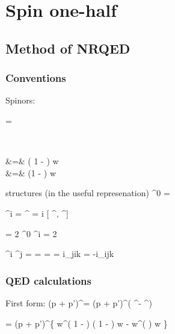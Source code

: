 \chapter{Spin one-half}

\section{Method of NRQED}
\subsection{Conventions}
Spinors:

\beq
	\sr = \begin{pmatrix} \eta \\ \chi \end{pmatrix}
\eeq

\beqa
	\eta &=& \left( 1  -  \right ) w	\\
	\chi &=& 	 \left(1 -  \right ) w	\\
\eeqa

structures (in the useful represenation)
\beq
	\gamma^0 = 
\eeq

\beq
	\gamma^i = 
\eeq	
\beq
	\sigma^{\mu \nu} = i  [ \gamma^\mu, \gamma^\nu]
\eeq

 = 2 \gamma^0 \gamma^i = 2  
\eeq


\beq
	\gamma^i \gamma^j =  
		=	
\eeq
{} = 
		=	i\epsilon_{jik} 
		=	-i\epsilon_{ijk} 
\eeq

\subsection{QED calculations}
First form:
\beq
	(p + p')^\mu \srb \sr  = (p + p')^\mu \left( \eta^\dagger \eta - \chi^\dagger \chi \right ) 
\eeq

\beq
	= (p + p')^\mu \left \{
		w^\dagger \left( 1 -  \right )  \left( 1 -  \right ) w
		- w^\dagger \left(   \right ) w \right \}
\eeq 

